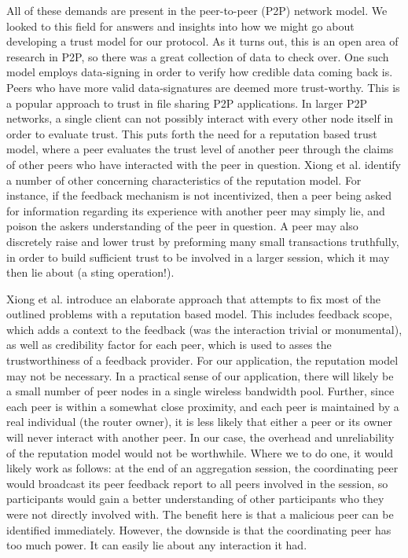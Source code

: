 \documentclass[12pt]{article}
\begin{document}
			All of these demands are present in the peer-to-peer (P2P) network model. We looked to this field for answers and insights into how we might go about developing a trust model for our protocol. As it turns out, this is an open area of research in P2P, so there was a great collection of data to check over. One such model employs data-signing in order to verify how credible data coming back is. Peers who have more valid data-signatures are deemed more trust-worthy. This is a popular approach to trust in file sharing P2P applications. In larger P2P networks, a single client can not possibly interact with every other node itself in order to evaluate trust. This puts forth the need for a reputation based trust model, where a peer evaluates the trust level of another peer through the claims of other peers who have interacted with the peer in question. Xiong et al. identify a number of other concerning characteristics of the reputation model. For instance, if the feedback mechanism is not incentivized, then a peer being asked for information regarding its experience with another peer may simply lie, and poison the askers understanding of the peer in question. A peer may also discretely raise and lower trust by preforming many small transactions truthfully, in order to build sufficient trust to be involved in a larger session, which it may then lie about (a sting operation!)\cite{1318566}.

			Xiong et al. introduce an elaborate approach that attempts to fix most of the outlined problems with a reputation based model. This includes feedback scope, which adds a context to the feedback (was the interaction trivial or monumental), as well as credibility factor for each peer, which is used to asses the trustworthiness of a feedback provider\cite{1318566}. For our application, the reputation model may not be necessary. In a practical sense of our application, there will likely be a small number of peer nodes in a single wireless bandwidth pool. Further, since each peer is within a somewhat close proximity, and each peer is maintained by a real individual (the router owner), it is less likely that either a peer or its owner will never interact with another peer. In our case, the overhead and unreliability of the reputation model would not be worthwhile. Where we to do one, it would likely work as follows: at the end of an aggregation session, the coordinating peer would broadcast its peer feedback report to all peers involved in the session, so participants would gain a better understanding of other participants who they were not directly involved with. The benefit here is that a malicious peer can be identified immediately. However, the downside is that the coordinating peer has too much power. It can easily lie about any interaction it had.
\end{document}
